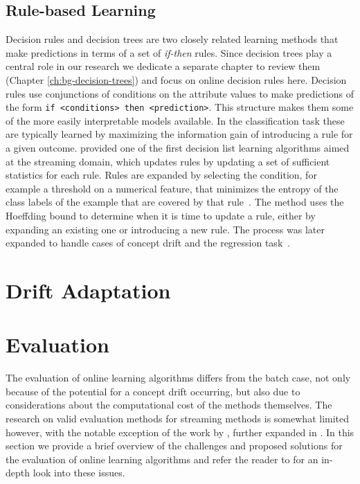 \subsection*{Rule-based Learning}
Decision rules \cite{decision-lists} and decision trees \cite{breiman1984cart} are two closely related learning methods
that make predictions in terms of a set of \emph{if-then} rules. Since
decision trees play a central role in our research we dedicate a separate
chapter to review them (Chapter \ref{ch:bg-decision-trees}) and focus on
online decision rules here. Decision rules use conjunctions of conditions
on the attribute values to make predictions of the form
\texttt{if <conditions> then <prediction>}. This structure makes them
some of the more easily interpretable models available.
In the classification task
these are typically learned by maximizing the information gain
of introducing a rule for a given outcome.
\citet{decision-rules-streams}
provided one of the first decision list learning algorithms aimed at the streaming
domain, which updates rules by updating a set of sufficient statistics for each
rule. Rules are expanded by selecting the condition, for example a threshold on
a numerical feature, that minimizes the entropy of the class labels of the example
that are covered by that rule~\cite{decision-rules-streams}.
The method uses the Hoeffding bound \cite{hoeffding-bound} to determine when it is time
to update a rule, either by expanding an existing one or introducing a new rule.
The process was later expanded to handle cases of concept drift \cite{adaptive-rules-classification}
and the regression task~\cite{adaptive-rules-regression}.






\section{Drift Adaptation}
\label{sec:bg-ol-adapation}

\section{Evaluation}
\label{sec:bg-ol-evaluation}

The evaluation of online learning algorithms differs from the batch
case, not only because of the potential for a concept drift occurring,
but also due to considerations about the computational cost of the
methods themselves. The research on valid evaluation methods for
streaming methods is somewhat limited however, with the notable exception
of the work by \citet{online-evaluation-kdd}, further expanded in
\cite{online-evaluation-journal}.
In this section we provide
a brief overview of the challenges and proposed solutions for
the evaluation of online learning algorithms and refer the
reader to \cite{online-evaluation-journal} for an in-depth look
into these issues.

